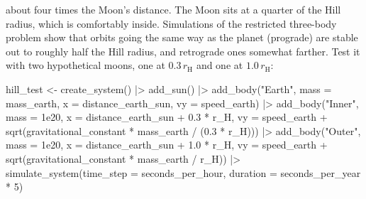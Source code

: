\documentclass[
  10.5pt,
  letterpaper,
]{scrbook}
\newenvironment{Shaded}{\begin{snugshade}}{\end{snugshade}}
\newcommand{\AttributeTok}[1]{\textcolor[rgb]{0.00,0.00,0.00}{#1}}
\newcommand{\DecValTok}[1]{\textcolor[rgb]{0.00,0.00,0.00}{#1}}
\newcommand{\FloatTok}[1]{\textcolor[rgb]{0.00,0.00,0.00}{#1}}
\newcommand{\FunctionTok}[1]{\textcolor[rgb]{0.00,0.00,0.00}{#1}}
\newcommand{\NormalTok}[1]{\textcolor[rgb]{0.00,0.00,0.00}{#1}}
\newcommand{\OtherTok}[1]{\textcolor[rgb]{0.00,0.00,0.00}{#1}}
\newcommand{\SpecialCharTok}[1]{\textcolor[rgb]{0.00,0.00,0.00}{#1}}
\newcommand{\StringTok}[1]{\textcolor[rgb]{0.00,0.00,0.00}{#1}}
\theoremstyle{plain}
\theoremstyle{remark}
\begin{document}
about four times the Moon's distance. The Moon sits at a quarter of the
Hill radius, which is comfortably inside. Simulations of the restricted
three-body problem show that orbits going the same way as the planet
(prograde) are stable out to roughly half the Hill radius, and
retrograde ones somewhat farther. Test it with two hypothetical moons,
one at \(0.3\,r_{\mathrm{H}}\) and one at \(1.0\,r_{\mathrm{H}}\):

\begin{Shaded}
\begin{Highlighting}[]
\NormalTok{hill\_test }\OtherTok{\textless{}{-}} \FunctionTok{create\_system}\NormalTok{() }\SpecialCharTok{|\textgreater{}}
  \FunctionTok{add\_sun}\NormalTok{() }\SpecialCharTok{|\textgreater{}}
  \FunctionTok{add\_body}\NormalTok{(}\StringTok{"Earth"}\NormalTok{, }\AttributeTok{mass =}\NormalTok{ mass\_earth, }\AttributeTok{x =}\NormalTok{ distance\_earth\_sun, }\AttributeTok{vy =}\NormalTok{ speed\_earth) }\SpecialCharTok{|\textgreater{}}
  \FunctionTok{add\_body}\NormalTok{(}\StringTok{"Inner"}\NormalTok{, }\AttributeTok{mass =} \FloatTok{1e20}\NormalTok{, }\AttributeTok{x =}\NormalTok{ distance\_earth\_sun }\SpecialCharTok{+} \FloatTok{0.3} \SpecialCharTok{*}\NormalTok{ r\_H,}
           \AttributeTok{vy =}\NormalTok{ speed\_earth }\SpecialCharTok{+} \FunctionTok{sqrt}\NormalTok{(gravitational\_constant }\SpecialCharTok{*}\NormalTok{ mass\_earth }\SpecialCharTok{/}\NormalTok{ (}\FloatTok{0.3} \SpecialCharTok{*}\NormalTok{ r\_H))) }\SpecialCharTok{|\textgreater{}}
  \FunctionTok{add\_body}\NormalTok{(}\StringTok{"Outer"}\NormalTok{, }\AttributeTok{mass =} \FloatTok{1e20}\NormalTok{, }\AttributeTok{x =}\NormalTok{ distance\_earth\_sun }\SpecialCharTok{+} \FloatTok{1.0} \SpecialCharTok{*}\NormalTok{ r\_H,}
           \AttributeTok{vy =}\NormalTok{ speed\_earth }\SpecialCharTok{+} \FunctionTok{sqrt}\NormalTok{(gravitational\_constant }\SpecialCharTok{*}\NormalTok{ mass\_earth }\SpecialCharTok{/}\NormalTok{ r\_H)) }\SpecialCharTok{|\textgreater{}}
  \FunctionTok{simulate\_system}\NormalTok{(}\AttributeTok{time\_step =}\NormalTok{ seconds\_per\_hour, }\AttributeTok{duration =}\NormalTok{ seconds\_per\_year }\SpecialCharTok{*} \DecValTok{5}\NormalTok{)}
\end{Highlighting}
\end{Shaded}
\end{document}
